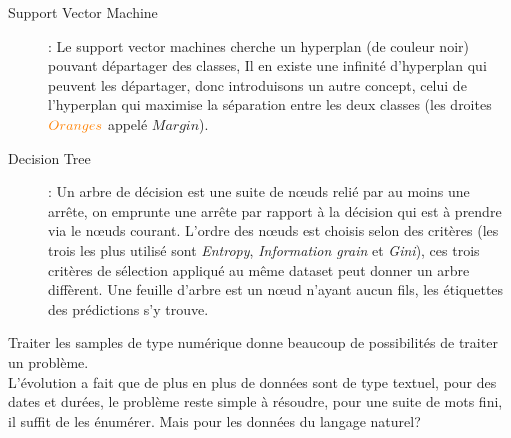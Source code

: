 \begin{description}
\item[Support Vector Machine]: Le support vector machines cherche un hyperplan (de couleur noir) pouvant départager des classes,
Il en existe une infinité d'hyperplan qui peuvent les départager, donc introduisons un autre concept, celui de 
l'hyperplan qui maximise la séparation entre les deux classes (les droites $\textcolor{orange}{Oranges}$ appelé $Margin$).\\

\item[Decision Tree]: Un arbre de décision est une suite de nœuds relié par au moins une arrête, on emprunte une arrête par rapport à la décision qui est à prendre via le nœuds courant. L'ordre des nœuds est choisis selon des critères (les trois les plus utilisé sont \textit{Entropy}, \textit{Information grain} et \textit{Gini}), ces trois critères de sélection appliqué au même dataset peut donner un arbre diffèrent. Une feuille d'arbre est un nœud n'ayant aucun fils, les étiquettes des prédictions s'y trouve.
\cshape{0.5}{
\begin{tikzpicture}[sibling distance=8em,
  every node/.style = {scale=1,
    draw=none, align=center}]]
  \node {$C < 2.77$}
 	  child { node {$B < 1.72$ }
 	    child { node {$Class B$}}
 	    child { node {$A < 3.67$}
 	      child { node {$Class A$}
 	      }
 	      child { node {$Class C$} }
 	    }
 	  }
 	  child { node {$Class A$} }
    ;
\end{tikzpicture}
}
\end{description}

\pagebreak
Traiter les samples de type numérique donne beaucoup de possibilités de traiter un problème.\\
L'évolution a fait que de plus en plus de données sont de type textuel, pour des dates et durées, le problème reste simple à résoudre, pour une suite de mots fini, il suffit de les énumérer. Mais pour les données du langage naturel?\\
\linebreak

